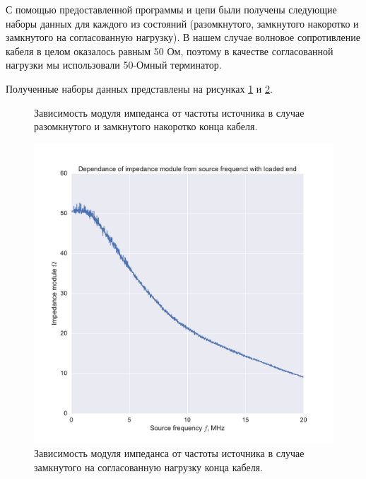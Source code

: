 \documentclass[a4paper, 12pt]{article}
\begin{document}
С помощью предоставленной программы и цепи были получены следующие наборы данных для каждого из состояний (разомкнутого, замкнутого накоротко и замкнутого на согласованную нагрузку). В нашем случае волновое сопротивление кабеля в целом оказалось равным 50 Ом, поэтому в качестве согласованной нагрузки мы использовали 50-Омный терминатор.

Полученные наборы данных представлены на рисунках \ref{fig:pt_3_1} и \ref{fig:pt_3_2}. 

\begin{figure}[H]
	\centering
	\caption{Зависимость модуля импеданса от частоты источника в случае разомкнутого  и замкнутого накоротко  конца кабеля.}
	\label{fig:pt_3_1}
\end{figure}

\begin{figure}[H]
	\centering
	\includegraphics[width=0.48\linewidth]{pt_3_loaded.pdf}
	\caption{Зависимость модуля импеданса от частоты источника в случае замкнутого на согласованную нагрузку конца кабеля.}
	\label{fig:pt_3_2}
\end{figure}
\end{document}
